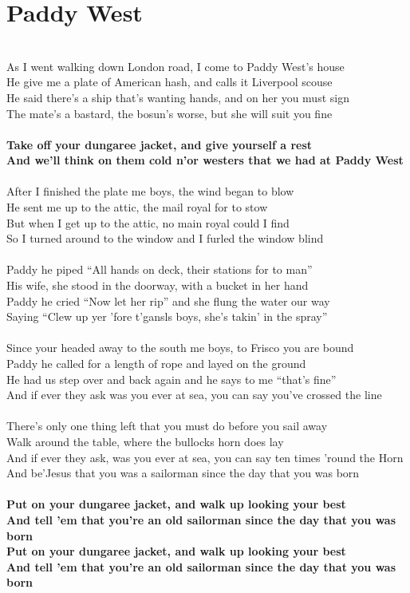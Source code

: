 \documentclass[letterpaper,14pt]{extarticle}
\begin{document}
\section{Paddy West}
\noindent
\\As I went walking down London road, I come to Paddy West's house
\\He give me a plate of American hash, and calls it Liverpool scouse
\\He said there's a ship that's wanting hands, and on her you must sign
\\The mate's a bastard, the bosun's worse, but she will suit you fine
\\
\\\textbf{Take off your dungaree jacket, and give yourself a rest
\\And we'll think on them cold n'or westers that we had at Paddy West}
\\
\\After I finished the plate me boys, the wind began to blow
\\He sent me up to the attic, the mail royal for to stow
\\But when I get up to the attic, no main royal could I find
\\So I turned around to the window and I furled the window blind
\\
\\Paddy he piped “All hands on deck, their stations for to man”
\\His wife, she stood in the doorway, with a bucket in her hand
\\Paddy he cried “Now let her rip” and she flung the water our way
\\Saying “Clew up yer 'fore t'gansls boys, she's takin' in the spray”
\\
\\Since your headed away to the south me boys, to Frisco you are bound
\\Paddy he called for a length of rope and layed on the ground
\\He had us step over and back again and he says to me “that's fine”
\\And if ever they ask was you ever at sea, you can say you've crossed the line
\\
\\There's only one thing left that you must do before you sail away
\\Walk around the table, where the bullocks horn does lay
\\And if ever they ask, was you ever at sea, you can say ten times 'round the Horn
\\And be'Jesus that you was a sailorman since the day that you was born
\\
\\\textbf{Put on your dungaree jacket, and walk up looking your best
\\And tell 'em that you're an old sailorman since the day that you was born
\\Put on your dungaree jacket, and walk up looking your best
\\And tell 'em that you're an old sailorman since the day that you was born}
\end{document}

